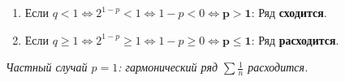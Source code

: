 \begin{tcolorbox}[title=Вывод по p-ряду]
    \begin{enumerate}
        \item Если $q < 1 \Leftrightarrow 2^{1-p} < 1 \Leftrightarrow 1-p < 0 \Leftrightarrow \mathbf{p > 1}$:
        Ряд \textbf{сходится}.
        
        \item Если $q \geq 1 \Leftrightarrow 2^{1-p} \geq 1 \Leftrightarrow 1-p \geq 0 \Leftrightarrow \mathbf{p \leq 1}$:
        Ряд \textbf{расходится}.
    \end{enumerate}
    \textit{Частный случай $p=1$: гармонический ряд $\sum \frac{1}{n}$ расходится.}
\end{tcolorbox}
